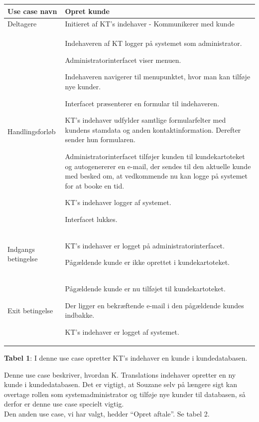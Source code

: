 \documentclass[12pt]{article}   %
\newcommand{\nextitem}{\par\hspace*{\labelsep}\textbullet\hspace*{\labelsep}}
\begin{document}
\hskip-1.0cm\begin{tabular}{l p{11cm}}
Use case navn & Opret kunde \\ \hline
Deltagere & \nextitem Initieret af KT's indehaver -
             Kommunikerer med kunde \\ \hline
Handlingsforløb &
	\nextitem Indehaveren af KT logger på systemet som administrator. 
	\nextitem  Administratorinterfacet viser menuen.
	\nextitem Indehaveren navigerer til menupunktet, hvor man kan tilføje nye	kunder.
		\nextitem Interfacet præsenterer en formular til indehaveren.
	\nextitem KT's indehaver udfylder samtlige formularfelter med kundens stamdata og anden kontaktinformation. Derefter sender hun formularen.		
	\nextitem Administratorinterfacet tilføjer kunden til kundekartoteket
	og autogenererer en e-mail, der sendes til den aktuelle kunde
		med besked om, at vedkommende nu kan logge på systemet for at
		booke en tid.
	\nextitem KT's indehaver logger af systemet. 
	\nextitem Interfacet lukkes.
	\\ \hline
	Indgangs betingelse &
		\nextitem KT's indehaver er logget på administratorinterfacet. 
		\nextitem Pågældende kunde er ikke oprettet i kundekartoteket. 
		\\ \hline
Exit betingelse & 
	\nextitem Pågældende kunde er nu tilføjet til
			kundekartoteket.
		\nextitem Der ligger en bekræftende e-mail i den pågældende kundes
			indbakke.
		\nextitem KT's indehaver er logget af systemet.\\ \hline
	\end{tabular}
\begin{center}
\textbf{Tabel 1}: I denne use case opretter KT's indehaver en kunde i kundedatabasen.
\end{center}
\vspace{0.5cm}

Denne use case beskriver, hvordan K. Translations indehaver opretter en ny kunde i kundedatabasen. Det er vigtigt, at Souzane selv på længere sigt kan overtage rollen som systemadministrator og tilføje nye kunder til databasen, så derfor er denne use case specielt vigtig. \\ 
\indent Den anden use case, vi har valgt, hedder ``Opret aftale''. Se tabel 2. \\
\end{document}

